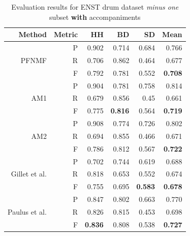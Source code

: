 \documentclass{article}
\begin{document}
\begin{table}[t]
\begin{footnotesize}
\centering
\begin{tabular*}{\textwidth}{@{\extracolsep{\stretch{1}}}*{6}{r}@{}}%
\hline
Method                         & Metric & HH             & BD             & SD             & Mean           \\ \hline
\multirow{3}{*}{PFNMF}         & P      & 0.902          & 0.714          & 0.684          & 0.766          \\
                               & R      & 0.706          & 0.862          & 0.464          & 0.677          \\
                               & F      & 0.792          & 0.781          & 0.552          & \textbf{0.708} \\ \hline
\multirow{3}{*}{AM1}       & P      & 0.904          & 0.781          & 0.758          & 0.814          \\
                               & R      & 0.679          & 0.856          & 0.45           & 0.661          \\
                               & F      & 0.775          & \textbf{0.816} & 0.564          & \textbf{0.719} \\ \hline
\multirow{3}{*}{AM2}       & P      & 0.908          & 0.774          & 0.726          & 0.802          \\
                               & R      & 0.694          & 0.855          & 0.466          & 0.671          \\
                               & F      & 0.786          & 0.812          & 0.567          & \textbf{0.722} \\ \hline
\multirow{3}{*}{Gillet et al.\cite{gillet_transcription_2008}} & P      & 0.702          & 0.744          & 0.619          & 0.688          \\
                               & R      & 0.818          & 0.653          & 0.552          & 0.674          \\
                               & F      & 0.755          & 0.695          & \textbf{0.583} & \textbf{0.678} \\ \hline
\multirow{3}{*}{Paulus et al.\cite{Paulus2009a}} & P      & 0.847          & 0.802          & 0.663          & 0.770          \\
                               & R      & 0.826          & 0.815          & 0.453          & 0.698          \\
                               & F      & \textbf{0.836} & 0.808          & 0.538          & \textbf{0.727} \\ \hline
\end{tabular*}
\end{footnotesize}
\caption{Evaluation results for ENST drum dataset \textit{minus one} subset \textbf{with} accompaniments}\label{results2}
\end{table}
\end{document}
